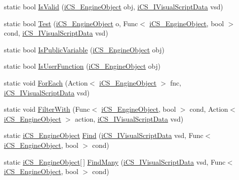 \begin{DoxyCompactItemize}
\item 
static bool \hyperlink{classi_c_s___visual_script_data_a9bbb8e158848eacdebfda102f0c918ad}{Is\+Valid} (\hyperlink{classi_c_s___engine_object}{i\+C\+S\+\_\+\+Engine\+Object} obj, \hyperlink{interfacei_c_s___i_visual_script_data}{i\+C\+S\+\_\+\+I\+Visual\+Script\+Data} vsd)
\item 
static bool \hyperlink{classi_c_s___visual_script_data_a30f2cf0015584bfcc734961499ca87cc}{Test} (\hyperlink{classi_c_s___engine_object}{i\+C\+S\+\_\+\+Engine\+Object} o, Func$<$ \hyperlink{classi_c_s___engine_object}{i\+C\+S\+\_\+\+Engine\+Object}, bool $>$ cond, \hyperlink{interfacei_c_s___i_visual_script_data}{i\+C\+S\+\_\+\+I\+Visual\+Script\+Data} vsd)
\item 
static bool \hyperlink{classi_c_s___visual_script_data_a2057a3e8b6f9e7ea4a03bb2649f48332}{Is\+Public\+Variable} (\hyperlink{classi_c_s___engine_object}{i\+C\+S\+\_\+\+Engine\+Object} obj)
\item 
static bool \hyperlink{classi_c_s___visual_script_data_a6581b9268ce9d6b4902eab799e4fa9e9}{Is\+User\+Function} (\hyperlink{classi_c_s___engine_object}{i\+C\+S\+\_\+\+Engine\+Object} obj)
\item 
static void \hyperlink{classi_c_s___visual_script_data_a01709506a0ff2600914fe2eb0900da33}{For\+Each} (Action$<$ \hyperlink{classi_c_s___engine_object}{i\+C\+S\+\_\+\+Engine\+Object} $>$ fnc, \hyperlink{interfacei_c_s___i_visual_script_data}{i\+C\+S\+\_\+\+I\+Visual\+Script\+Data} vsd)
\item 
static void \hyperlink{classi_c_s___visual_script_data_aec847d50c23673c76b667f4f33e1267e}{Filter\+With} (Func$<$ \hyperlink{classi_c_s___engine_object}{i\+C\+S\+\_\+\+Engine\+Object}, bool $>$ cond, Action$<$ \hyperlink{classi_c_s___engine_object}{i\+C\+S\+\_\+\+Engine\+Object} $>$ action, \hyperlink{interfacei_c_s___i_visual_script_data}{i\+C\+S\+\_\+\+I\+Visual\+Script\+Data} vsd)
\item 
static \hyperlink{classi_c_s___engine_object}{i\+C\+S\+\_\+\+Engine\+Object} \hyperlink{classi_c_s___visual_script_data_ad6b1f23b0eb54c3fa6670aebc43bfd07}{Find} (\hyperlink{interfacei_c_s___i_visual_script_data}{i\+C\+S\+\_\+\+I\+Visual\+Script\+Data} vsd, Func$<$ \hyperlink{classi_c_s___engine_object}{i\+C\+S\+\_\+\+Engine\+Object}, bool $>$ cond)
\item 
static \hyperlink{classi_c_s___engine_object}{i\+C\+S\+\_\+\+Engine\+Object}\mbox{[}$\,$\mbox{]} \hyperlink{classi_c_s___visual_script_data_af5342c9ddd07f0e3ece6dcf7948e126d}{Find\+Many} (\hyperlink{interfacei_c_s___i_visual_script_data}{i\+C\+S\+\_\+\+I\+Visual\+Script\+Data} vsd, Func$<$ \hyperlink{classi_c_s___engine_object}{i\+C\+S\+\_\+\+Engine\+Object}, bool $>$ cond)

\end{DoxyCompactItemize}
